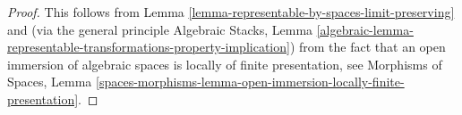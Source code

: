 \documentclass{stacks-project}
\theoremstyle{plain}
\theoremstyle{definition}
\theoremstyle{remark}
\numberwithin{equation}{subsection}
\begin{document}
\begin{proof}
This follows from
Lemma \ref{lemma-representable-by-spaces-limit-preserving}
and (via the general principle
Algebraic Stacks, Lemma
\ref{algebraic-lemma-representable-transformations-property-implication})
from the fact that an open immersion of algebraic spaces is
locally of finite presentation, see
Morphisms of Spaces, Lemma
\ref{spaces-morphisms-lemma-open-immersion-locally-finite-presentation}.
\end{proof}
\end{document}
